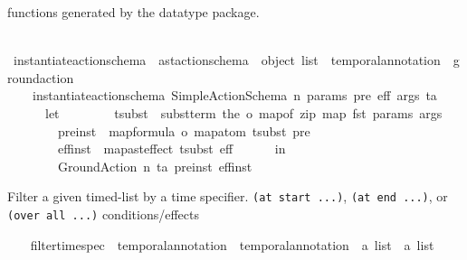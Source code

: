 \begin{isabellebody}
\begin{isamarkuptext}
    functions generated by the datatype package.%
\end{isamarkuptext}\isamarkuptrue%
\ \ \isamarkupfalse%
\ instantiate{\isacharunderscore}{\kern0pt}action{\isacharunderscore}{\kern0pt}schema\ {\isacharcolon}{\kern0pt}{\isacharcolon}{\kern0pt}\ {\isachardoublequoteopen}ast{\isacharunderscore}{\kern0pt}action{\isacharunderscore}{\kern0pt}schema\ {\isasymRightarrow}\ object\ list\ {\isasymRightarrow}\ temporal{\isacharunderscore}{\kern0pt}annotation\ {\isasymRightarrow}\ ground{\isacharunderscore}{\kern0pt}action{\isachardoublequoteclose}\ \isanewline
\ \ \ \ {\isachardoublequoteopen}instantiate{\isacharunderscore}{\kern0pt}action{\isacharunderscore}{\kern0pt}schema\ {\isacharparenleft}{\kern0pt}Simple{\isacharunderscore}{\kern0pt}Action{\isacharunderscore}{\kern0pt}Schema\ n\ params\ pre\ eff{\isacharparenright}{\kern0pt}\ args\ ta\ {\isacharequal}{\kern0pt}\ \isanewline
\ \ \ \ \ \ {\isacharparenleft}{\kern0pt}let\isanewline
\ \ \ \ \ \ \ \ tsubst\ {\isacharequal}{\kern0pt}\ subst{\isacharunderscore}{\kern0pt}term\ {\isacharparenleft}{\kern0pt}the\ o\ {\isacharparenleft}{\kern0pt}map{\isacharunderscore}{\kern0pt}of\ {\isacharparenleft}{\kern0pt}zip\ {\isacharparenleft}{\kern0pt}map\ fst\ params{\isacharparenright}{\kern0pt}\ args{\isacharparenright}{\kern0pt}{\isacharparenright}{\kern0pt}{\isacharparenright}{\kern0pt}{\isacharsemicolon}{\kern0pt}\isanewline
\ \ \ \ \ \ \ \ pre{\isacharunderscore}{\kern0pt}inst\ {\isacharequal}{\kern0pt}\ {\isacharparenleft}{\kern0pt}map{\isacharunderscore}{\kern0pt}formula\ o\ map{\isacharunderscore}{\kern0pt}atom{\isacharparenright}{\kern0pt}\ tsubst\ pre{\isacharsemicolon}{\kern0pt}\isanewline
\ \ \ \ \ \ \ \ eff{\isacharunderscore}{\kern0pt}inst\ {\isacharequal}{\kern0pt}\ {\isacharparenleft}{\kern0pt}map{\isacharunderscore}{\kern0pt}ast{\isacharunderscore}{\kern0pt}effect{\isacharparenright}{\kern0pt}\ tsubst\ eff\isanewline
\ \ \ \ \ \ in\isanewline
\ \ \ \ \ \ \ \ Ground{\isacharunderscore}{\kern0pt}Action\ n\ ta\ pre{\isacharunderscore}{\kern0pt}inst\ eff{\isacharunderscore}{\kern0pt}inst\isanewline
\ \ \ \ \ \ {\isacharparenright}{\kern0pt}{\isachardoublequoteclose}%
\begin{isamarkuptext}%
Filter a given timed-list by a time specifier. 
  \texttt{(at start ...)}, \texttt{(at end ...)}, or \texttt{(over all ...)} conditions/effects%
\end{isamarkuptext}\isamarkuptrue%
\ \ \isamarkupfalse%
\ filter{\isacharunderscore}{\kern0pt}time{\isacharunderscore}{\kern0pt}spec\ {\isacharcolon}{\kern0pt}{\isacharcolon}{\kern0pt}\ {\isachardoublequoteopen}temporal{\isacharunderscore}{\kern0pt}annotation\ {\isasymRightarrow}\ {\isacharparenleft}{\kern0pt}temporal{\isacharunderscore}{\kern0pt}annotation\ {\isasymtimes}\ {\isacharprime}{\kern0pt}a{\isacharparenright}{\kern0pt}\ list\ {\isasymRightarrow}\ {\isacharprime}{\kern0pt}a\ list{\isachardoublequoteclose}\ \isanewline

\end{isabellebody}
